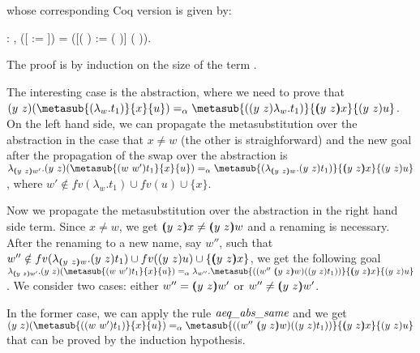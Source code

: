 \noindent whose corresponding Coq version is given by: \newline 
\begin{coqdoccode}
\coqdocnoindent
{} : \coqdockw{\ensuremath{\forall}}     ,    ([ := ]) = ([(   ) := (   )] (   )).\coqdoceol
\end{coqdoccode}
 The proof is by induction on the size of the term .
\begin{coqdoccode}
\end{coqdoccode}
The interesting case is the abstraction, where we need to prove that $\swap{y}{z}{(\metasub{(\lambda_w.t_1)}{x}{u})} =_\alpha \metasub{(\swap{y}{z}{\lambda_w.t_1})}{\vswap{y}{z}{x}}{\swap{y}{z}{u}}$. On the left hand side, we can propagate the metasubstitution over the abstraction in the case that $x \neq w$ (the other is straighforward) and the new goal after the propagation of the swap over the abstraction is $\lambda_{\vswap{y}{z}{w'}}.\swap{y}{z}{(\metasub{\swap{w}{w'}{t_1}}{x}{u})} =_\alpha \metasub{(\lambda_{\vswap{y}{z}{w}}.\swap{y}{z}{t_1})}{\vswap{y}{z}{x}}{\swap{y}{z}{u}}$, where $w' \notin fv(\lambda_w.t_1) \cup fv(u) \cup \{x\}$.
\begin{coqdoccode}
\end{coqdoccode}
Now we propagate the metasubstitution over the abstraction in the right hand side term. Since $x\neq w$, we get $\vswap{y}{z}{x} \neq \vswap{y}{z}{w}$ and a renaming is necessary. After the renaming to a new name, say $w''$, such that $w'' \notin fv(\lambda_{\vswap{y}{z}{w}}.\swap{y}{z}{t_1}) \cup fv(\swap{y}{z}{u}) \cup \{\vswap{y}{z}{x}\}$, we get the following goal $\lambda_{\vswap{y}{z}{w'}}.\swap{y}{z}{(\metasub{\swap{w}{w'}{t_1}}{x}{u})} =_\alpha \lambda_{w''}.\metasub{(\swap{w''}{\vswap{y}{z}{w}}{(\swap{y}{z}{t_1})})}{\vswap{y}{z}{x}}{\swap{y}{z}{u}}$. We consider two cases: either $w'' = (\!\!(y\ z)\!\!) w'$ or $w'' \neq (\!\!(y\ z)\!\!) w'$.
\begin{coqdoccode}
\end{coqdoccode}
In the former case, we can apply the rule $\mbox{\it aeq}\_\mbox{\it abs}\_\mbox{\it same}$ and we get $\swap{y}{z}{(\metasub{(\swap{w}{w'}{t_1})}{x}{u})} =_\alpha \metasub{(\swap{w''}{\vswap{y}{z}{w}}{(\swap{y}{z}{t_1})})}{\vswap{y}{z}{x}}{\swap{y}{z}{u}}$ that can be proved by the induction hypothesis.

